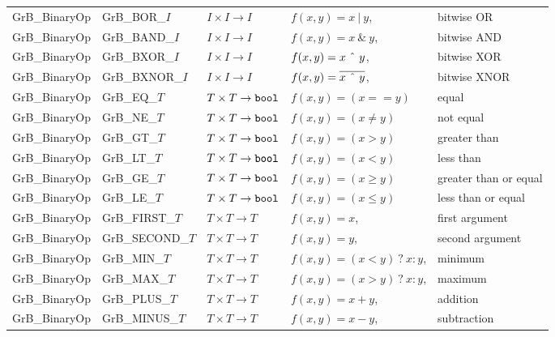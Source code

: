 \begin{table}
\begin{threeparttable}
\begin{tabular}{l|l|l|ll}
{\sf GrB\_BinaryOp}   & {\sf GrB\_BOR\_$I$}   & $I \times I \rightarrow I$ & $f(x,y) = x ~|~ y$, & bitwise OR \\
{\sf GrB\_BinaryOp}   & {\sf GrB\_BAND\_$I$}  & $I \times I \rightarrow I$ & $f(x,y) = x ~\&~ y$, & bitwise AND \\
{\sf GrB\_BinaryOp}   & {\sf GrB\_BXOR\_$I$}  & $I \times I \rightarrow I$ & $f(x,y) = x ~\mbox{\^{}}~ y$, & bitwise XOR \\
{\sf GrB\_BinaryOp}   & {\sf GrB\_BXNOR\_$I$} & $I \times I \rightarrow I$ & $f(x,y) = \overline{x ~\mbox{\^{}}~ y}$, & bitwise XNOR \\

{\sf GrB\_BinaryOp}   & {\sf GrB\_EQ\_$T$}    & $T \times T \rightarrow {\tt bool}$  & $f(x,y) = (x == y)$ & equal \\
{\sf GrB\_BinaryOp}   & {\sf GrB\_NE\_$T$}    & $T \times T \rightarrow {\tt bool}$  & $f(x,y) = (x \neq y)$ & not equal \\
{\sf GrB\_BinaryOp}   & {\sf GrB\_GT\_$T$}    & $T \times T \rightarrow {\tt bool}$  & $f(x,y) = (x > y)$ & greater than  \\
{\sf GrB\_BinaryOp}   & {\sf GrB\_LT\_$T$}    & $T \times T \rightarrow {\tt bool}$  & $f(x,y) = (x < y)$ & less than  \\
{\sf GrB\_BinaryOp}   & {\sf GrB\_GE\_$T$}    & $T \times T \rightarrow {\tt bool}$  & $f(x,y) = (x \geq y)$ & greater than or equal \\
{\sf GrB\_BinaryOp}   & {\sf GrB\_LE\_$T$}    & $T \times T \rightarrow {\tt bool}$  & $f(x,y) = (x \leq y)$ & less than or equal \\
{\sf GrB\_BinaryOp}   & {\sf GrB\_FIRST\_$T$} & $T \times T \rightarrow T$  & $f(x,y) = x$, & first argument \\
{\sf GrB\_BinaryOp}   & {\sf GrB\_SECOND\_$T$}& $T \times T \rightarrow T$  & $f(x,y) = y$, & second argument \\
{\sf GrB\_BinaryOp}   & {\sf GrB\_MIN\_$T$}   & $T \times T \rightarrow T$  & $f(x,y) = (x < y)~?~x : y$, & minimum \\
{\sf GrB\_BinaryOp}   & {\sf GrB\_MAX\_$T$}   & $T \times T \rightarrow T$  & $f(x,y) = (x > y)~?~x : y$, & maximum \\
{\sf GrB\_BinaryOp}   & {\sf GrB\_PLUS\_$T$}  & $T \times T \rightarrow T$  & $f(x,y) = x + y$, & addition \\
{\sf GrB\_BinaryOp}   & {\sf GrB\_MINUS\_$T$} & $T \times T \rightarrow T$  & $f(x,y) = x - y$, & subtraction \\

\end{tabular}
\end{threeparttable}
\end{table}
